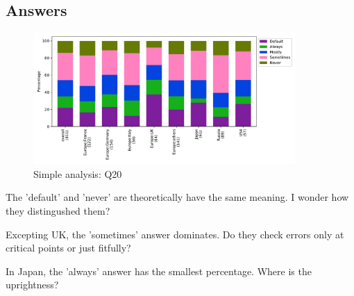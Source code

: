 
\subsection{Answers}


\begin{figure}[htb]
\begin{center}
\includegraphics[width=10cm]{../pdfs/Q20.pdf}
\caption{Simple analysis: Q20}
\label{fig:Q20}
\end{center}
\end{figure}

The 'default' and 'never' are theoretically have the same meaning. I
wonder how they distingushed them?

Excepting UK, the 'sometimes' answer dominates. Do they check errors
only at critical points or just fitfully?

In Japan, the 'always' answer has the smallest percentage.  Where is
the uprightness?

